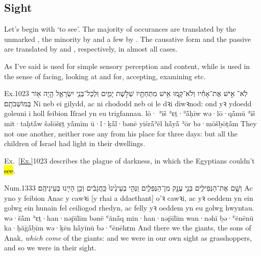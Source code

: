 \subsection{Sight}


\begin{paper}
	{\click} Let’s begin with  ‘to see’. The majority of occurances are translated by the unmarked , the minority by  and a few by . The causative form  and the passive  are translated by  and , respectively, in almost all cases.

	As I’ve said  is used for simple sensory perception and content, while  is used in the sense of facing, looking at and for, accepting, examining etc.
\end{paper}




\begin{example}{Ex.}{10}{23}{}{}
	\quoling
	{לֹֽא־ אִ֣ישׁ אֶת־אָחִ֗יו וְלֹא־קָ֛מוּ אִ֥ישׁ מִתַּחְתָּ֖יו שְׁלֹ֣שֶׁת יָמִ֑ים וּֽלְכָל־בְּנֵ֧י יִשְׂרָאֵ֛ל הָ֥יָה א֖וֹר בְּמוֹשְׁבֹתָֽם׃}
	{Ni  neb ei gilydd, ac ni chododd neb oi le dꝛi diwꝛnod: ond yꝛ ydoedd goleuni i holl feibion Iſrael yn eu trigfannau.}
	{lō· ʾīš ʾɛṯ·ʾå̄ḥīw wə·lō·qå̄mū ʾīš mit·taḥtå̄w šəlōšɛṯ yå̄mīm ū·l·ḵå̄l·bənē yiśrå̄ʾēl hå̄yå̄ ʾōr bə·mōšḇōṯå̄m}
	{They  not one another, neither rose any from his place for three days: but all the children of Israel had light in their dwellings.}
\end{example}

\begin{paper}
	{\click} Ex.~\vref{Ex.}{10}{23}{} describes the plague of darkness, in which the Egyptians couldn’t \hl{see}.
\end{paper}

\begin{example}{Num.}{13}{33}{}{}
	\quoling
	{וְשָׁ֣ם  אֶת־הַנְּפִילִ֛ים בְּנֵ֥י עֲנָ֖ק מִן־הַנְּפִלִ֑ים וַנְּהִ֤י בְעֵינֵ֙ינוּ֙ כַּֽחֲגָבִ֔ים וְכֵ֥ן הָיִ֖ינוּ בְּעֵינֵיהֶֽם׃}
	{Ac yno y  feibion Anac y cawꝛi [y rhai a ddaethant] o’ꝛ cawꝛi, ac yꝛ oeddem yn ein golwg ein hunain fel ceiliogod rhedyn, ac felly yꝛ oeddem yn eu golwg hwyntau.}
	{wə·šå̄m  ʾɛṯ·han·nəp̄īlīm bənē ʿănå̄q min·han·nəp̄īlīm wan·nəhī ḇə·ʿēnēnū ka·ḥăḡå̄ḇīm wə·ḵēn hå̄yīnū bə·ʿēnēhɛm}
	{And there we  the giants, the sons of Anak, \emph{which come} of the giants: and we were in our own sight as grasshoppers, and so we were in their sight.}
\end{example}

